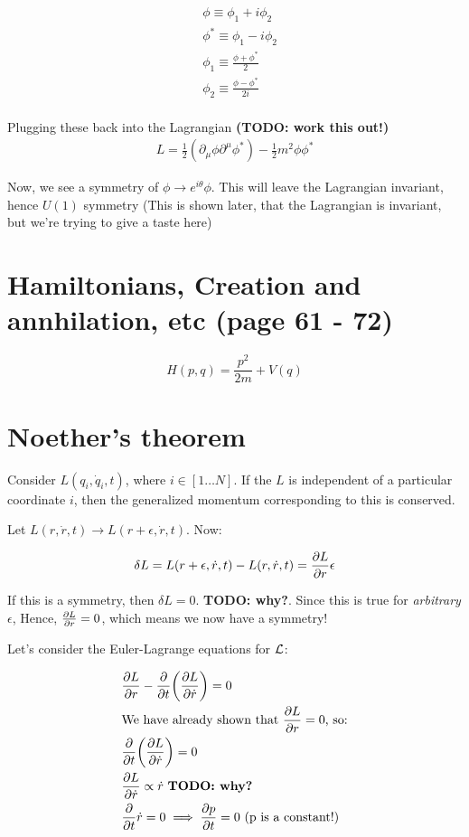 \begin{align*}
&\phi \equiv \phi_1 + i \phi_2 \\
&\phi^* \equiv \phi_1 - i \phi_2 \\
&\phi_1 \equiv \frac{\phi + \phi^*}{2} \\
&\phi_2 \equiv   \frac{\phi - \phi^*}{2i} \\
\end{align*}

Plugging these back into the Lagrangian \textbf{(TODO: work this out!)}
\begin{align*}
L = \frac{1}{2}(\partial_\mu \phi \partial^\mu \phi^*) - \frac{1}{2}m^2 \phi \phi^*
\end{align*}

Now, we see a symmetry of $\phi \to e^{i \theta}\phi$. This will leave the Lagrangian invariant, hence
$U(1)$ symmetry (This is shown later, that the Lagrangian is invariant, but we're trying to give a taste here)


\chapter{Hamiltonians, Creation and annhilation, etc (page 61 - 72)}
$$H(p, q) = \frac{p^2}{2m} + V(q)$$

\chapter{Noether's theorem}

Consider $L(q_i, \dot q_i, t)$, where $i \in [1\dots N]$.
If the $L$ is independent of a particular coordinate $i$, then the generalized momentum
corresponding to this is conserved.

Let $L(r, \dot r, t) \to L(r + \epsilon, \dot r, t)$. Now:

\begin{align*}
\delta L = L(r + \epsilon, \dot r, t) - L(r, \dot r, t) = \pdv{L}{r} \epsilon
\end{align*}

If this is a symmetry, then $\delta L = 0$. \textbf{TODO: why?}. Since this is
true for \textit{arbitrary} $\epsilon$, Hence, $\pdv{L}{r} = 0$, which means
we now have a symmetry!

Let's consider the Euler-Lagrange equations for $\mathcal{L}$:

\begin{align*}
 &\pdv{L}{r} - \pdv{t} \bigg( \pdv{L}{\dot r} \bigg) = 0 \\
&\text{We have already shown that $\pdv{L}{r} = 0$, so:} \\
&\pdv{t} \bigg( \pdv{L}{\dot r} \bigg) = 0 \\
&\pdv{L}{\dot r} \propto \dot r~\textbf{TODO: why?} \\
&\pdv{t} \dot r = 0 \implies \pdv{p}{t} = 0~\text{(p is a constant!)}
\end{align*}

